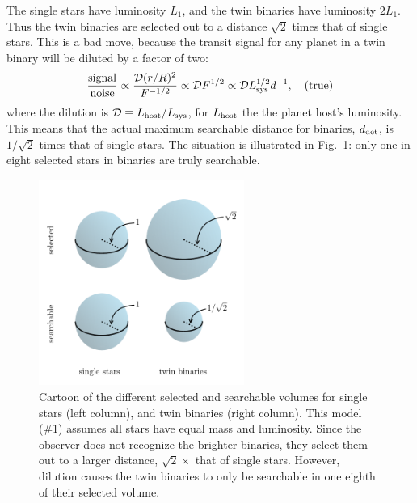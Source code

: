The single stars have luminosity $L_1$, and the twin binaries have luminosity 
$2L_1$.
Thus the twin binaries are selected out to a distance $\sqrt{2}$ times 
that of single stars.
This is a bad move, because the transit signal for any planet in a 
twin binary will be diluted by a factor of two:
\begin{equation}
\frac{{\rm signal}}{{\rm noise}}
\propto \frac{\mathcal{D} (r/R)^2}{F^{-1/2}}
\propto \mathcal{D} F^{1/2}
\propto \mathcal{D} L_{\rm sys}^{1/2} d^{-1}, \quad ({\rm true})
\end{equation}
where the dilution is $\mathcal{D} \equiv L_{\rm host}/L_{\rm sys}$, for 
$L_{\rm host}$ the the planet host's luminosity.
This means that the actual maximum searchable distance for binaries, $d_{\rm 
det}$, is $1/\sqrt{2}$ times that of single stars.
The situation is illustrated in Fig.~\ref{fig:model_1_volumes}: only one in 
eight selected stars in binaries are truly searchable.

\begin{figure}[!tb]
    \begin{center}
        \includegraphics[width=0.6\textwidth]{figures/visualize_volumes.pdf}
    \end{center}
    \caption{
        Cartoon of the different selected and searchable volumes for single 
        stars (left column), and twin binaries (right column).
        This model (\#1) assumes all stars have equal mass and luminosity.
        Since the observer does not recognize the brighter binaries, they 
        select 
        them out to a larger distance, $\sqrt{2}\times$ that of single stars.
        However, dilution causes the twin binaries to only be searchable in 
        one 
        eighth of their selected volume.
    }
    \label{fig:model_1_volumes}
\end{figure}


